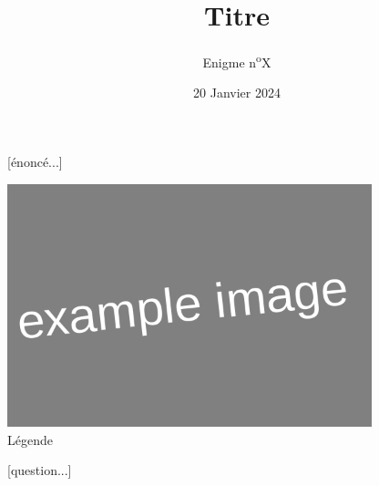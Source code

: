 \documentclass[a4paper, top=10mm]{article}
\title{\textbf{\huge{Titre}}}
\author{Enigme n\textsuperscript{o}X}
\date{20 Janvier 2024}
\begin{document}
	\maketitle
	
	[énoncé...]
	
	\begin{center}
		\includegraphics[height=200pt]{00example.png}\\
		Légende
	\end{center}
	
	[question...]
	
\end{document}
